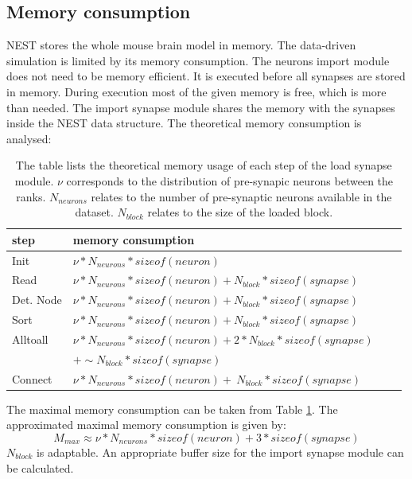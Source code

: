 \subsection{Memory consumption}
NEST stores the whole mouse brain model in memory.
The data-driven simulation is limited by its memory consumption.
The neurons import module does not need to be memory efficient.
It is executed before all synapses are stored in memory.
During execution most of the given memory is free, which is more than needed.
The import synapse module shares the memory with the synapses inside the NEST data structure.
The theoretical memory consumption is analysed:
\begin{table}[ht!]
\centering
\begin{tabular}{| l | l | l | l |}
    \hline
    step & memory consumption \\ \hline \hline
    Init & $\nu * N_{neurons} * sizeof(neuron)$ \\ \hline
    Read & $\nu * N_{neurons} * sizeof(neuron) + N_{block} * sizeof(synapse)$ \\ \hline
    Det. Node & $\nu * N_{neurons} * sizeof(neuron) + N_{block} * sizeof(synapse)$ \\ \hline
    Sort & $\nu * N_{neurons} * sizeof(neuron) + N_{block} * sizeof(synapse)$ \\ \hline
    Alltoall & $\nu * N_{neurons} * sizeof(neuron) + 2 * N_{block} * sizeof(synapse)$ \\
    &$ + \sim N_{block} * sizeof(synapse)$ \\ \hline
    Connect & $\nu * N_{neurons} * sizeof(neuron) +  ~N_{block} * sizeof(synapse) $ \\ \hline 
    \end{tabular}
\caption[Theoretical memory usage of each step of the load synapse module]{The table lists the theoretical memory usage of each step of the load synapse module.
$\nu$ corresponds to the distribution of pre-synapic neurons between the ranks.
$N_{neurons}$ relates to the number of pre-synaptic neurons available in the dataset.
$N_{block}$ relates to the size of the loaded block.}
\label{tab:stepmemory}
\end{table}
The maximal memory consumption can be taken from Table \ref{tab:stepmemory}.
The approximated maximal memory consumption is given by:
\begin{equation}
 M_{max} \approx \nu * N_{neurons} * sizeof(neuron) + 3 * sizeof(synapse)
\end{equation}
$N_{block}$ is adaptable.
An appropriate buffer size for the import synapse module can be calculated.
